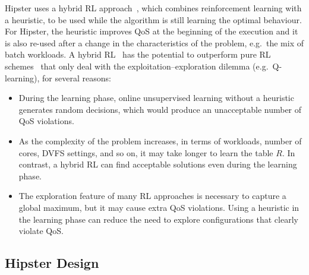 


Hipster uses a hybrid RL approach~\citep{TesauroAAllocation}, which combines reinforcement
learning with a heuristic, to be used while the algorithm is still learning the optimal
behaviour. For Hipster, the heuristic improves QoS at the beginning of the execution and
it is also re-used after a change in the characteristics of the problem, e.g.\ the mix of
batch workloads. A hybrid RL~\citep{TesauroAAllocation} has the potential to outperform
pure RL schemes~\citep{2007IBMReports,Tesauro2005OnlineLearning.} that only deal with the
exploitation--exploration dilemma (e.g.\ Q-learning), for several reasons: 

\begin{itemize}

     \item[{\small \circled{1}}] During the learning phase, online
        unsupervised learning without a heuristic generates random decisions, which would
        produce an unacceptable number of QoS violations.

 \item[{\small \circled{2}}] As the complexity of the problem increases, in
    terms of workloads, number of cores, DVFS settings, and so on, it may take longer to
        learn the table $R$. In contrast, a hybrid RL can find acceptable solutions even
        during the learning phase.

 \item[{\small \circled{3}}] The exploration feature of many RL approaches is
    necessary to capture a global maximum, but it may cause extra QoS violations.  Using a
        heuristic in the learning phase can reduce the need to explore configurations that
        clearly violate QoS.

\end{itemize}


\subsection{Hipster Design}
\label{subsec: design}

